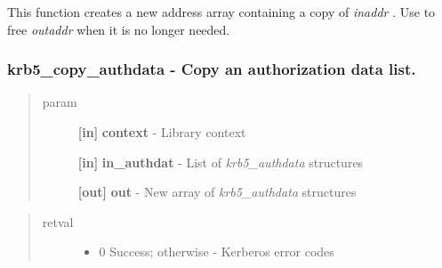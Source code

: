 \documentclass[letterpaper,10pt,english]{sphinxmanual}
\begin{document}
This function creates a new address array containing a copy of \emph{inaddr} . Use {\hyperref[appdev/refs/api/krb5_free_addresses:c.krb5_free_addresses]{}} to free \emph{outaddr} when it is no longer needed.


\subsubsection{krb5\_copy\_authdata -  Copy an authorization data list.}
\label{appdev/refs/api/krb5_copy_authdata:krb5-copy-authdata-copy-an-authorization-data-list}\label{appdev/refs/api/krb5_copy_authdata::doc}

\begin{fulllineitems}
\label{appdev/refs/api/krb5_copy_authdata:c.krb5_copy_authdata}
\end{fulllineitems}

\begin{quote}\begin{description}
\item[{param}] \leavevmode
\textbf{{[}in{]}} \textbf{context} - Library context

\textbf{{[}in{]}} \textbf{in\_authdat} - List of \emph{krb5\_authdata} structures

\textbf{{[}out{]}} \textbf{out} - New array of \emph{krb5\_authdata} structures

\end{description}\end{quote}
\begin{quote}\begin{description}
\item[{retval}] \leavevmode\begin{itemize}
\item {} 
0   Success; otherwise - Kerberos error codes

\end{itemize}

\end{description}\end{quote}
\end{document}
